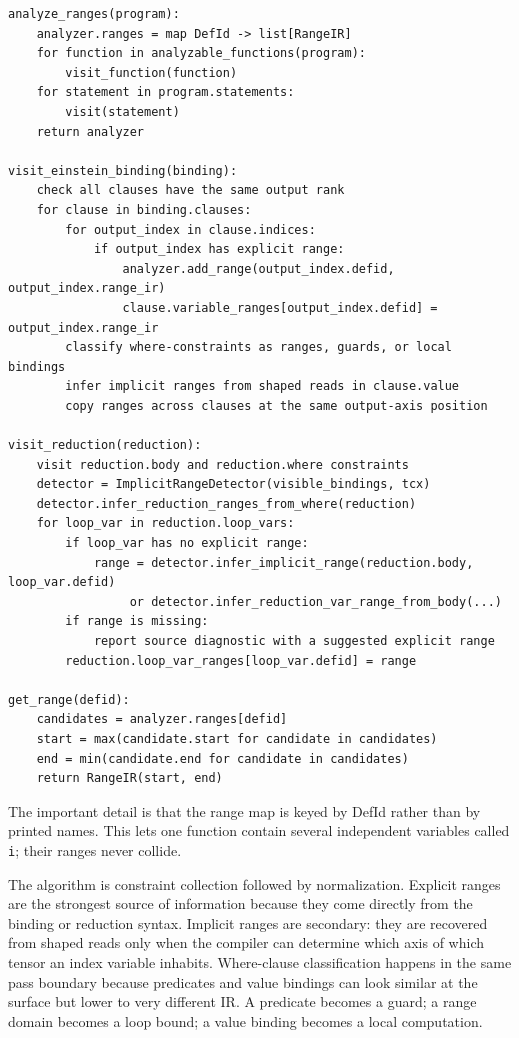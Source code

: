 \begin{lstlisting}[style=pythoncode,caption={Range inference for indices and reductions.}]
analyze_ranges(program):
    analyzer.ranges = map DefId -> list[RangeIR]
    for function in analyzable_functions(program):
        visit_function(function)
    for statement in program.statements:
        visit(statement)
    return analyzer

visit_einstein_binding(binding):
    check all clauses have the same output rank
    for clause in binding.clauses:
        for output_index in clause.indices:
            if output_index has explicit range:
                analyzer.add_range(output_index.defid, output_index.range_ir)
                clause.variable_ranges[output_index.defid] = output_index.range_ir
        classify where-constraints as ranges, guards, or local bindings
        infer implicit ranges from shaped reads in clause.value
        copy ranges across clauses at the same output-axis position

visit_reduction(reduction):
    visit reduction.body and reduction.where constraints
    detector = ImplicitRangeDetector(visible_bindings, tcx)
    detector.infer_reduction_ranges_from_where(reduction)
    for loop_var in reduction.loop_vars:
        if loop_var has no explicit range:
            range = detector.infer_implicit_range(reduction.body, loop_var.defid)
                 or detector.infer_reduction_var_range_from_body(...)
        if range is missing:
            report source diagnostic with a suggested explicit range
        reduction.loop_var_ranges[loop_var.defid] = range

get_range(defid):
    candidates = analyzer.ranges[defid]
    start = max(candidate.start for candidate in candidates)
    end = min(candidate.end for candidate in candidates)
    return RangeIR(start, end)
\end{lstlisting}

The important detail is that the range map is keyed by DefId rather than by
printed names. This lets one function contain several independent variables
called \texttt{i}; their ranges never collide.

The algorithm is constraint collection followed by normalization. Explicit
ranges are the strongest source of information because they come directly from
the binding or reduction syntax. Implicit ranges are secondary: they are
recovered from shaped reads only when the compiler can determine which axis of
which tensor an index variable inhabits. Where-clause classification happens in
the same pass boundary because predicates and value bindings can look similar
at the surface but lower to very different IR. A predicate becomes a guard; a
range domain becomes a loop bound; a value binding becomes a local computation.

